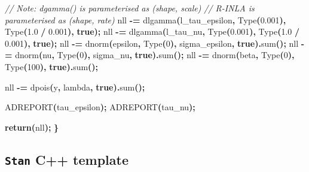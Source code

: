 \documentclass[a4paper, nobind]{templates/ociamthesis}
\newenvironment{Shaded}{\begin{snugshade}}{\end{snugshade}}
\newcommand{\CommentTok}[1]{\textcolor[rgb]{0.56,0.35,0.01}{\textit{#1}}}
\newcommand{\ControlFlowTok}[1]{\textcolor[rgb]{0.13,0.29,0.53}{\textbf{#1}}}
\newcommand{\DecValTok}[1]{\textcolor[rgb]{0.00,0.00,0.81}{#1}}
\newcommand{\FloatTok}[1]{\textcolor[rgb]{0.00,0.00,0.81}{#1}}
\newcommand{\KeywordTok}[1]{\textcolor[rgb]{0.13,0.29,0.53}{\textbf{#1}}}
\newcommand{\NormalTok}[1]{#1}
\newcommand{\OperatorTok}[1]{\textcolor[rgb]{0.81,0.36,0.00}{\textbf{#1}}}
\renewenvironment{Shaded}
{
  \vspace{10pt}%
  \begin{snugshade}%
}{%
  \end{snugshade}%
  \vspace{8pt}%
}
\begin{document}
\begin{Shaded}
\begin{Highlighting}[]
  \CommentTok{// Note: dgamma() is parameterised as (shape, scale)}
  \CommentTok{// R{-}INLA is parameterised as (shape, rate)}
\NormalTok{  nll }\OperatorTok{{-}=}\NormalTok{ dlgamma}\OperatorTok{(}\NormalTok{l\_tau\_epsilon}\OperatorTok{,}\NormalTok{ Type}\OperatorTok{(}\FloatTok{0.001}\OperatorTok{),}\NormalTok{ Type}\OperatorTok{(}\FloatTok{1.0} \OperatorTok{/} \FloatTok{0.001}\OperatorTok{),} \KeywordTok{true}\OperatorTok{);}
\NormalTok{  nll }\OperatorTok{{-}=}\NormalTok{ dlgamma}\OperatorTok{(}\NormalTok{l\_tau\_nu}\OperatorTok{,}\NormalTok{ Type}\OperatorTok{(}\FloatTok{0.001}\OperatorTok{),}\NormalTok{ Type}\OperatorTok{(}\FloatTok{1.0} \OperatorTok{/} \FloatTok{0.001}\OperatorTok{),} \KeywordTok{true}\OperatorTok{);}
\NormalTok{  nll }\OperatorTok{{-}=}\NormalTok{ dnorm}\OperatorTok{(}\NormalTok{epsilon}\OperatorTok{,}\NormalTok{ Type}\OperatorTok{(}\DecValTok{0}\OperatorTok{),}\NormalTok{ sigma\_epsilon}\OperatorTok{,} \KeywordTok{true}\OperatorTok{).}\NormalTok{sum}\OperatorTok{();}
\NormalTok{  nll }\OperatorTok{{-}=}\NormalTok{ dnorm}\OperatorTok{(}\NormalTok{nu}\OperatorTok{,}\NormalTok{ Type}\OperatorTok{(}\DecValTok{0}\OperatorTok{),}\NormalTok{ sigma\_nu}\OperatorTok{,} \KeywordTok{true}\OperatorTok{).}\NormalTok{sum}\OperatorTok{();}
\NormalTok{  nll }\OperatorTok{{-}=}\NormalTok{ dnorm}\OperatorTok{(}\NormalTok{beta}\OperatorTok{,}\NormalTok{ Type}\OperatorTok{(}\DecValTok{0}\OperatorTok{),}\NormalTok{ Type}\OperatorTok{(}\DecValTok{100}\OperatorTok{),} \KeywordTok{true}\OperatorTok{).}\NormalTok{sum}\OperatorTok{();}
  
\NormalTok{  nll }\OperatorTok{{-}=}\NormalTok{ dpois}\OperatorTok{(}\NormalTok{y}\OperatorTok{,}\NormalTok{ lambda}\OperatorTok{,} \KeywordTok{true}\OperatorTok{).}\NormalTok{sum}\OperatorTok{();}
  
\NormalTok{  ADREPORT}\OperatorTok{(}\NormalTok{tau\_epsilon}\OperatorTok{);}
\NormalTok{  ADREPORT}\OperatorTok{(}\NormalTok{tau\_nu}\OperatorTok{);}
  
  \ControlFlowTok{return}\OperatorTok{(}\NormalTok{nll}\OperatorTok{);}
\OperatorTok{\}}
\end{Highlighting}
\end{Shaded}

\hypertarget{stan-epil}{%
\subsection{\texorpdfstring{\texttt{Stan} C++ template}{Stan C++ template}}\label{stan-epil}}
\end{document}
